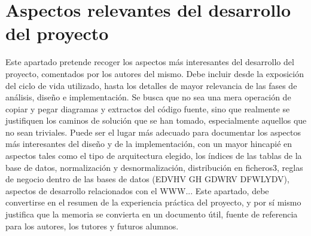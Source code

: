 \chapter{Aspectos relevantes del desarrollo del proyecto} %
\label{cha:Aspectos relevantes del desarrollo del proyecto}

Este apartado pretende recoger los aspectos más interesantes del desarrollo del
proyecto, comentados por los autores del mismo. Debe incluir desde la
exposición del ciclo de vida utilizado, hasta los detalles de mayor relevancia
de las fases de análisis, diseño e implementación. Se busca que no sea una mera
operación de copiar y pegar diagramas y extractos del código fuente, sino que
realmente se justifiquen los caminos de solución que se han tomado,
especialmente aquellos que no sean triviales. Puede ser el lugar más adecuado
para documentar los aspectos más interesantes del diseño y de la
implementación, con un mayor hincapié en aspectos tales como el tipo de
arquitectura elegido, los índices de las tablas de la base de datos,
normalización y desnormalización, distribución en ficheros3, reglas de negocio
dentro de las bases de datos (EDVHV GH GDWRV DFWLYDV), aspectos de desarrollo
relacionados con el WWW... Este apartado, debe convertirse en el resumen de la
experiencia práctica del proyecto, y por sí mismo justifica que la memoria se
convierta en un documento útil, fuente de referencia para los autores, los
tutores y futuros alumnos.

